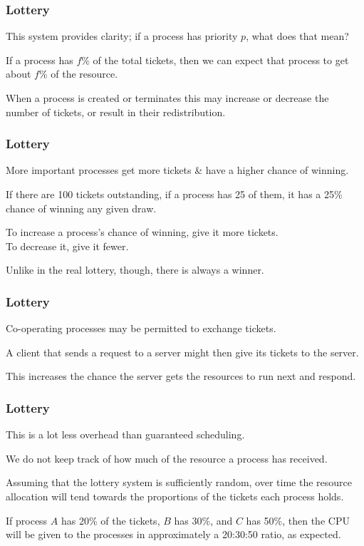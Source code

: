 \begin{frame}
\frametitle{Lottery}

This system provides clarity; if a process has priority $p$, what does that mean? 

If a process has $f$\% of the total tickets, then we can expect that process to get about $f$\% of the resource. 

When a process is created or terminates this may increase or decrease the number of tickets, or result in their redistribution.


\end{frame}

\begin{frame}
\frametitle{Lottery}

More important processes get more tickets \& have a higher chance of winning. 

If there are 100 tickets outstanding, if a process has 25 of them, it has a 25\% chance of winning any given draw. 

To increase a process's chance of winning, give it more tickets.\\
\quad To decrease it, give it fewer. 

Unlike in the real lottery, though, there is always a winner.

\end{frame}

\begin{frame}
\frametitle{Lottery}

Co-operating processes may be permitted to exchange tickets. 

A client that sends a request to a server might then give its tickets to the server.

This increases the chance the server gets the resources to run next and respond.

\end{frame}

\begin{frame}
\frametitle{Lottery}

This is a lot less overhead than guaranteed scheduling. 

We do not keep track of how much of the resource a process has received. 

Assuming that the lottery system is sufficiently random, over time the resource allocation will tend towards the proportions of the tickets each process holds. 

If process $A$ has 20\% of the tickets, $B$ has 30\%, and $C$ has 50\%, then the CPU will be given to the processes in approximately a 20:30:50 ratio, as expected.


\end{frame}

